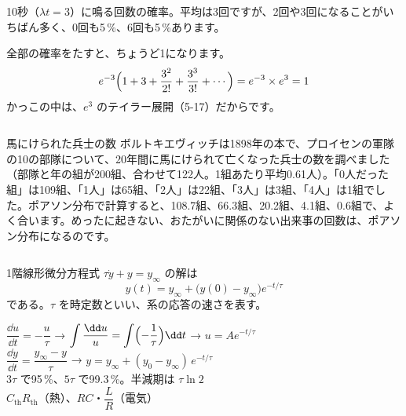 \noindent\begin{minipage}[c]{0.52\linewidth}
\end{minipage}\hfill
\begin{minipage}[c]{0.44\linewidth}
10秒（$\lambda t=3$）に鳴る回数の確率。平均は3回ですが、2回や3回になることがいちばん多く、0回も5\,\%、6回も5\,\%あります。
\end{minipage}
\par\vspace{3pt}
\noindent 全部の確率をたすと、ちょうど1になります。
\[ e^{-3}\Bigl(1+3+\frac{3^2}{2!}+\frac{3^3}{3!}+\cdots\Bigr)=e^{-3}\times e^3=1 \]
かっこの中は、$e^3$ のテイラー展開（5-17）だからです。

\begin{column}{馬にけられた兵士の数}
ボルトキエヴィッチは1898年の本で、プロイセンの軍隊の10の部隊について、20年間に馬にけられて亡くなった兵士の数を調べました（部隊と年の組が200組、合わせて122人。1組あたり平均0.61人）。「0人だった組」は109組、「1人」は65組、「2人」は22組、「3人」は3組、「4人」は1組でした。ポアソン分布で計算すると、108.7組、66.3組、20.2組、4.1組、0.6組で、よく合います。めったに起きない、おたがいに関係のない出来事の回数は、ポアソン分布になるのです。
\end{column}

\begin{senmonsho}[大学の教科書ふうの書き方]
\begin{bkhonbun}
1階線形微分方程式 $\tau\dot y+y=y_\infty$ の解は
\[ y(t)=y_\infty+\bigl(y(0)-y_\infty\bigr)e^{-t/\tau} \]
である。$\tau$ を時定数といい、系の応答の速さを表す。
\end{bkhonbun}
\end{senmonsho}

\begin{taisetsu}
\def\tsl#1{\makebox[5.4\zw][l]{\sffamily\bfseries\small\color{\bkTT}#1}}
\tsl{変数分離}$\dfrac{\dd u}{\dd t}=-\dfrac{u}{\tau}$ → $\displaystyle\int\frac{\dd u}{u}=\int\Bigl(-\frac{1}{\tau}\Bigr)\dd t$ → $u=Ae^{-t/\tau}$\\[4pt]
\tsl{目標へ近づく}$\dfrac{\dd y}{\dd t}=\dfrac{y_\infty-y}{\tau}$ → $y=y_\infty+(y_0-y_\infty)\,e^{-t/\tau}$\\[4pt]
\tsl{時定数}$3\tau$ で95\,\%、$5\tau$ で99.3\,\%。半減期は $\tau\ln2$\\[4pt]
\tsl{時定数の例}$C_{\mathrm{th}}R_{\mathrm{th}}$（熱）、$RC$・$\dfrac{L}{R}$（電気）
\end{taisetsu}

